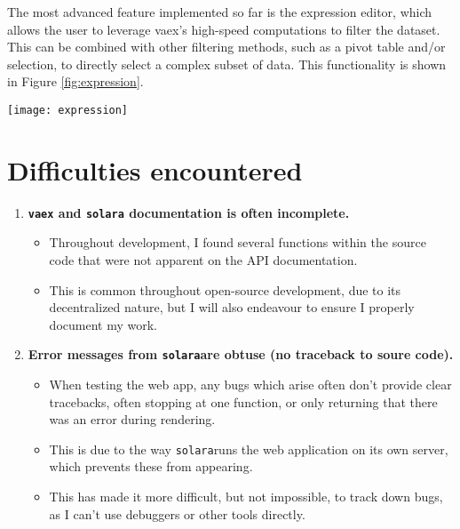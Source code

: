 \documentclass[a4paper,10pt,twocolumn]{article}
\newcommand{\solara}{\texttt{solara}}
\begin{document}
The most advanced feature implemented so far is the expression editor, which allows the user to leverage vaex's high-speed computations to filter the dataset. This can be combined with other filtering methods, such as a pivot table and/or selection, to directly select a complex subset of data. This functionality is shown in Figure \ref{fig:expression}.

\begin{figure*}[htpb]
	\centering
	\texttt{[image: expression]}
	\caption{A showcase of the full cross-filtering functionality within the scatter plot. A filter is applied by an expression, then a subset is chosen using the pivot table (left). Finally a subset of the data can be selected within the scatter plot via the lasoo tool.}
	\label{fig:expression}
\end{figure*}

\section{Difficulties encountered}
\begin{enumerate}
	\item \textbf{\texttt{vaex} and \texttt{solara} documentation is often incomplete.}
	      \begin{itemize}
		      \item Throughout development, I found several functions within the source code that were not apparent on the API documentation.
		      \item This is common throughout open-source development, due to its decentralized nature, but I will also endeavour to ensure I properly document my work.
	      \end{itemize}
	\item \textbf{Error messages from \solara are obtuse (no traceback to soure code).}
	      \begin{itemize}
		      \item When testing the web app, any bugs which arise often don't provide clear tracebacks, often stopping at one function, or only returning that there was an error during rendering.
		      \item This is due to the way \solara runs the web application on its own server, which prevents these from appearing.
		      \item This has made it more difficult, but not impossible, to track down bugs, as I can't use debuggers or other tools directly.
	      \end{itemize}
\end{enumerate}
\end{document}
